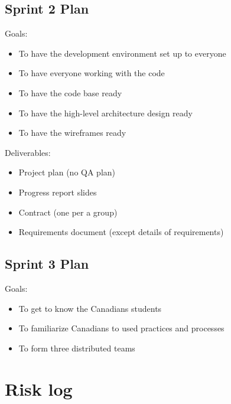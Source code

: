 \subsection{Sprint 2 Plan}

Goals:
\begin{itemize}
\item To have the development environment set up to everyone
\item To have everyone working with the code 
\item To have the code base ready 
\item To have the high-level architecture design ready
\item To have the wireframes ready
\end{itemize}

\noindent Deliverables:
\begin{itemize}
\item Project plan (no QA plan)
\item Progress report slides
\item Contract (one per a group)
\item Requirements document (except details of requirements)
\end{itemize}

\subsection{Sprint 3 Plan}

Goals:
\begin{itemize}
\item To get to know the Canadians students
\item To familiarize Canadians to used practices and processes
\item To form three distributed teams

\end{itemize}

\section{Risk log}

